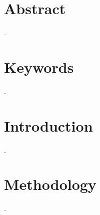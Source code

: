 \documentclass[12pt, a4paper]{article}
\begin{document}
\section*{Abstract} %
.

\section*{Keywords} %
.

\newpage
\tableofcontents
\newpage


\section{Introduction}
.

\section{Methodology}
.

\end{document}
